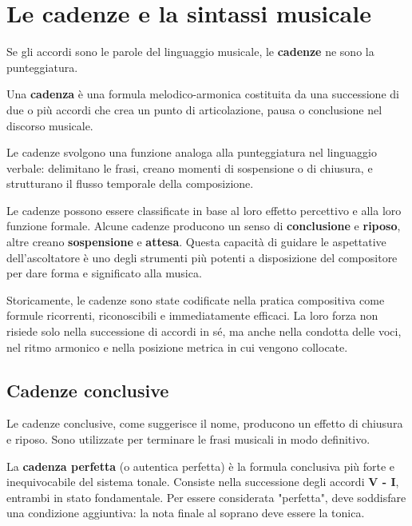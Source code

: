 	\chapter{Le cadenze e la sintassi musicale}
	\label{chap:cadenze}
	
	Se gli accordi sono le parole del linguaggio musicale, le \textbf{cadenze} ne sono la punteggiatura. 
		
\begin{definizione}[La Cadenza]
	\label{def:cadenza}
	Una \textbf{cadenza} è una formula melodico-armonica costituita da una successione di due o più accordi che crea un punto di articolazione, pausa o conclusione nel discorso musicale.
\end{definizione}

Le cadenze svolgono una funzione analoga alla punteggiatura nel linguaggio verbale: delimitano le frasi, creano momenti di sospensione o di chiusura, e strutturano il flusso temporale della composizione.

Le cadenze possono essere classificate in base al loro effetto percettivo e alla loro funzione formale. Alcune cadenze producono un senso di \textbf{conclusione} e \textbf{riposo}, altre creano \textbf{sospensione} e \textbf{attesa}. Questa capacità di guidare le aspettative dell'ascoltatore è uno degli strumenti più potenti a disposizione del compositore per dare forma e significato alla musica.

Storicamente, le cadenze sono state codificate nella pratica compositiva come formule ricorrenti, riconoscibili e immediatamente efficaci. La loro forza non risiede solo nella successione di accordi in sé, ma anche nella condotta delle voci, nel ritmo armonico e nella posizione metrica in cui vengono collocate.
	
	\section{Cadenze conclusive}
	\label{sec:cadenze_conclusive}
	
	Le cadenze conclusive, come suggerisce il nome, producono un effetto di chiusura e riposo. Sono utilizzate per terminare le frasi musicali in modo definitivo.
	
	\begin{definizione}
		\label{def:cadenza_perfetta}
		La \textbf{cadenza perfetta} (o autentica perfetta) è la formula conclusiva più forte e inequivocabile del sistema tonale. Consiste nella successione degli accordi \textbf{V - I}, entrambi in stato fondamentale. Per essere considerata "perfetta", deve soddisfare una condizione aggiuntiva: la nota finale al soprano deve essere la tonica.
	\end{definizione}
	
